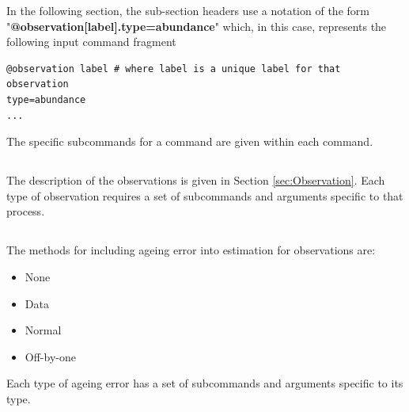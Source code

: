 In the following section, the sub-section headers use a notation of the form "\textbf {@observation[label].type=abundance}" which, in this case, represents the following input command fragment
{\small{\begin{verbatim}
@observation label # where label is a unique label for that observation
type=abundance
...
\end{verbatim}}}
The specific subcommands for a command are given within each command.

\subsection{}\label{syntax:ObservationTypes}

The description of the observations is given in Section \ref{sec:Observation}. Each type of observation requires a set of subcommands and arguments specific to that process.

\ifAgeBased

\else

\fi 

\subsection{}


\ifAgeBased
\subsection{}\label{syntax:AgeingError}

The methods for including ageing error into estimation for observations are:

\begin{itemize}
	\item None
	\item Data
	\item Normal
	\item Off-by-one
\end{itemize}

Each type of ageing error has a set of subcommands and arguments specific to its type.


\fi %
%

